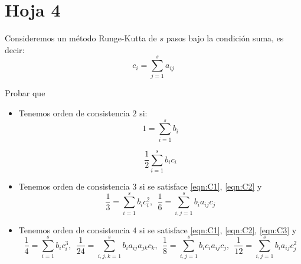 \section{Hoja 4}
\begin{problem}[1]
Consideremos un método Runge-Kutta de $s$ pasos bajo la condición suma, es decir:
\begin{equation}
\tag{CS}
c_i = \sum_{j=1}^s a_{ij}
\label{eqn:CS}
\end{equation}

Probar que
\begin{itemize}
\item Tenemos orden de consistencia $2$ si:
\begin{equation}
\tag{C1}
1=\sum_{i=1}^sb_i
\label{eqn:C1}
\end{equation}

\begin{equation}
\tag{C2}
\frac{1}{2} \sum_{i=1}^sb_ic_i
\label{eqn:C2}
\end{equation}

\item Tenemos orden de consistencia $3$ si se satisface \ref{eqn:C1}, \ref{eqn:C2} y
\begin{equation}
\tag{C3}
\frac{1}{3} = \sum_{i=1}^sb_ic_i^2, \ \ \frac{1}{6}=\sum_{i,j=1}^sb_ia_{ij}c_j
\label{eqn:C3}
\end{equation}

\item Tenemos orden de consistencia $4$ si se satisface \ref{eqn:C1}, \ref{eqn:C2}, \ref{eqn:C3} y
\small
\begin{equation}
\tag{C4}
\frac{1}{4} = \sum_{i=1}^sb_ic_i^3, \ \ \frac{1}{24}=\sum_{i,j,k=1}^sb_ia_{ij}a_{jk}c_k, \ \ \frac{1}{8}=\sum_{i,j=1}^sb_ic_ia_{ij}c_j, \ \ \frac{1}{12}=\sum_{i,j=1}^sb_ia_{ij}c_j^2
\label{eqn:C4}
\end{equation}
\normalsize
\end{itemize}
\solution

\end{problem}

